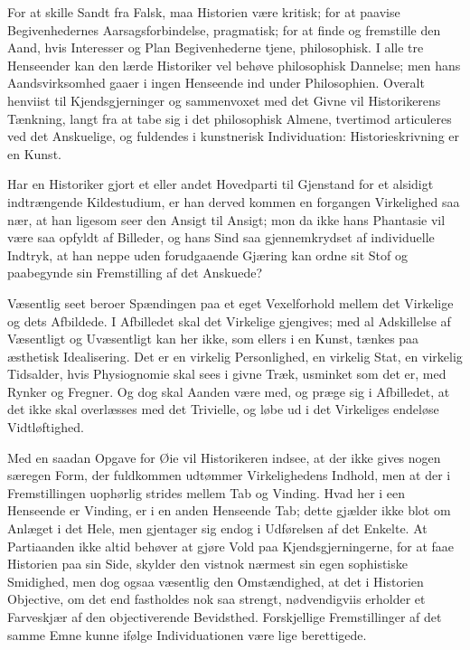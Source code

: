 \documentclass[12pt]{book}
\newcommand{\opage}[1]{\marginnote{\footnotesize\textit{[#1]}}}
\begin{document}
\opage{90} For at skille Sandt fra Falsk, maa Historien være kritisk; for at paavise Begivenhedernes
Aarsagsforbindelse, pragmatisk; for at finde og fremstille den Aand, hvis Interesser og
Plan Begivenhederne tjene, philosophisk. I alle tre Henseender kan den lærde Historiker vel
behøve philosophisk Dannelse; men hans Aandsvirksomhed gaaer i ingen Henseende ind under
Philosophien. Overalt henviist til Kjendsgjerninger og sammenvoxet med det Givne vil
Historikerens Tænkning, langt fra at tabe sig i det philosophisk Almene, tvertimod
articuleres ved det Anskuelige, og fuldendes i kunstnerisk Individuation: Historieskrivning
er en Kunst.

Har en Historiker gjort et eller andet Hovedparti til Gjenstand for et alsidigt
indtrængende Kildestudium, er han derved kommen en forgangen Virkelighed saa nær, at han
ligesom seer den Ansigt til Ansigt; mon da ikke hans Phantasie vil være saa opfyldt af
Billeder, og hans Sind saa gjennemkrydset af individuelle Indtryk, at han neppe uden
forudgaaende Gjæring kan ordne sit Stof og paabegynde sin Fremstilling af det Anskuede?

Væsentlig seet beroer Spændingen paa et eget Vexelforhold mellem det Virkelige og dets
Afbildede. I Afbilledet skal det Virkelige gjengives; med al Adskillelse af Væsentligt og
Uvæsentligt kan her ikke, som ellers i en Kunst, tænkes paa æsthetisk Idealisering. Det er
en virkelig Personlighed, en virkelig Stat, en virkelig Tidsalder, hvis Physiognomie skal
sees i givne Træk, usminket som det er, med Rynker og Fregner. Og dog skal Aanden være med,
og præge sig i Afbilledet, at det ikke skal overlæsses med det Trivielle, og løbe ud i det
Virkeliges endeløse Vidtløftighed.

Med en saadan Opgave for Øie vil Historikeren indsee, at der ikke gives nogen særegen Form,
der fuldkommen udtømmer Virkelighedens Indhold, men at der i Fremstillingen uophørlig
strides mellem Tab og Vinding. Hvad her i een Henseende er Vinding, er i en anden Henseende
\opage{91} Tab; dette gjælder ikke blot om Anlæget i det Hele, men gjentager sig endog i Udførelsen af
det Enkelte. At Partiaanden ikke altid behøver at gjøre Vold paa Kjendsgjerningerne, for at
faae Historien paa sin Side, skylder den vistnok nærmest sin egen sophistiske Smidighed, men
dog ogsaa væsentlig den Omstændighed, at det i Historien Objective, om det end fastholdes
nok saa strengt, nødvendigviis erholder et Farveskjær af den objectiverende Bevidsthed.
Forskjellige Fremstillinger af det samme Emne kunne ifølge Individuationen være lige
berettigede.
\end{document}
